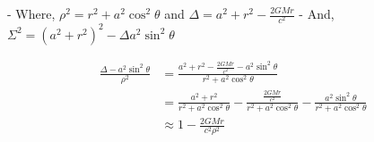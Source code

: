 - Where, $\rho^2=r^2+a^2 \cos ^2 \theta$ and $\Delta=a^2+r^2-\frac{2 G M r}{c^2}$
- And, $\Sigma^2=\left(a^2+r^2\right)^2-\Delta a^2 \sin ^2 \theta$


\begin{align}
    \frac{\Delta-a^2 \sin ^2 \theta}{\rho^2} & =\frac{a^2+r^2-\frac{2 G M r}{c^2}-a^2 \sin ^2 \theta}{r^2+a^2 \cos ^2 \theta}                                                               \\
                                             & =\frac{a^2+r^2}{r^2+a^2 \cos ^2 \theta}-\frac{\frac{2 G M r}{c^2}}{r^2+a^2 \cos ^2 \theta}-\frac{a^2 \sin ^2 \theta}{r^2+a^2 \cos ^2 \theta} \\
                                             & \approx 1-\frac{2 G M r}{c^2 \rho^2}
\end{align}

